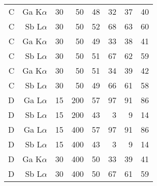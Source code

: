 \begin{table}[phtb]
\begin{center}
\begin{tabular}{rrrrrrrr}
            \hline
            C               & Ga K$\alpha$  & 30             & 50             & 48                     & 32                      & 37                      & 40                      \\
            C               & Sb L$\alpha$  & 30             & 50             & 52                     & 68                      & 63                      & 60                      \\
            C               & Ga K$\alpha$  & 30             & 50             & 49                     & 33                      & 38                      & 41                      \\
            C               & Sb L$\alpha$  & 30             & 50             & 51                     & 67                      & 62                      & 59                      \\
            C               & Ga K$\alpha$  & 30             & 50             & 51                     & 34                      & 39                      & 42                      \\
            C               & Sb L$\alpha$  & 30             & 50             & 49                     & 66                      & 61                      & 58                      \\
            \hline
            D               & Ga L$\alpha$  & 15             & 200            & 57                     & 97                      & 91                      & 86                      \\
            D               & Sb L$\alpha$  & 15             & 200            & 43                     & 3                       & 9                       & 14                      \\
            D               & Ga L$\alpha$  & 15             & 400            & 57                     & 97                      & 91                      & 86                      \\
            D               & Sb L$\alpha$  & 15             & 400            & 43                     & 3                       & 9                       & 14                      \\
            D               & Ga K$\alpha$  & 30             & 400            & 50                     & 33                      & 39                      & 41                      \\
            D               & Sb L$\alpha$  & 30             & 400            & 50                     & 67                      & 61                      & 59                      \\
            \hline
        \end{tabular}
    \end{center}
\end{table}
\restoregeometry %

